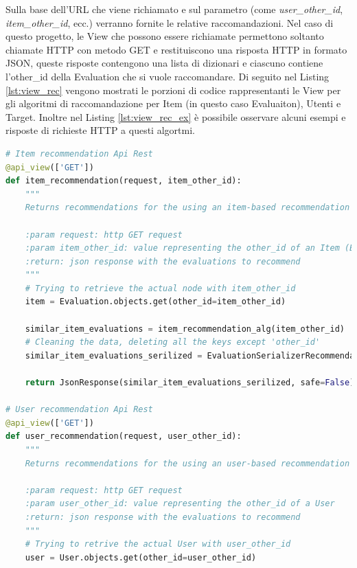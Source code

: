 Sulla base dell'URL che viene richiamato e sul parametro (come \textit{user\_other\_id}, \textit{item\_other\_id}, ecc.) verranno fornite le 
relative raccomandazioni. Nel caso di questo progetto, le View che possono essere richiamate permettono soltanto chiamate HTTP con metodo GET 
e restituiscono una risposta HTTP in formato JSON, queste risposte contengono una lista di dizionari e ciascuno contiene l'other\_id della Evaluation 
che si vuole raccomandare. Di seguito nel Listing \ref{lst:view_rec} vengono mostrati le porzioni di codice rappresentanti 
le View per gli algoritmi di raccomandazione per Item (in questo caso Evaluaiton), Utenti e Target. Inoltre nel Listing \ref{lst:view_rec_ex} è 
possibile osservare alcuni esempi e risposte di richieste HTTP a questi algortmi.\hfill\break
\lstset{style=python_code_style}
\begin{lstlisting}[language=Python, label=lst:view_rec, caption={Porzione parziale del codice contenuto nelle View per implementare
    i sistemi di raccomandazione.}]
# Item recommendation Api Rest
@api_view(['GET'])
def item_recommendation(request, item_other_id):
    """
    Returns recommendations for the using an item-based recommendation algorithm for the Evaluation `item_other_id`

    :param request: http GET request
    :param item_other_id: value representing the other_id of an Item (Evaluation)
    :return: json response with the evaluations to recommend
    """
    # Trying to retrieve the actual node with item_other_id
    item = Evaluation.objects.get(other_id=item_other_id)

    similar_item_evaluations = item_recommendation_alg(item_other_id)
    # Cleaning the data, deleting all the keys except 'other_id'
    similar_item_evaluations_serilized = EvaluationSerializerRecommendation(similar_item_evaluations, many=True).data

    return JsonResponse(similar_item_evaluations_serilized, safe=False)

# User recommendation Api Rest
@api_view(['GET'])
def user_recommendation(request, user_other_id):
    """
    Returns recommendations for the using an user-based recommendation algorithm for the user `user_other_id`

    :param request: http GET request
    :param user_other_id: value representing the other_id of a User
    :return: json response with the evaluations to recommend
    """
    # Trying to retrive the actual User with user_other_id
    user = User.objects.get(other_id=user_other_id)


\end{lstlisting}
